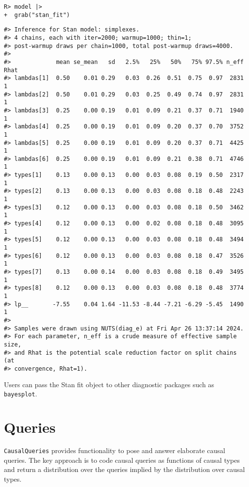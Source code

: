 \documentclass[
  11pt,
  article]{jss}
\begin{document}
\begin{verbatim}
R> model |> 
+  grab("stan_fit")
\end{verbatim}

\begin{verbatim}
#> Inference for Stan model: simplexes.
#> 4 chains, each with iter=2000; warmup=1000; thin=1; 
#> post-warmup draws per chain=1000, total post-warmup draws=4000.
#> 
#>             mean se_mean   sd   2.5%   25%   50%   75% 97.5% n_eff Rhat
#> lambdas[1]  0.50    0.01 0.29   0.03  0.26  0.51  0.75  0.97  2831    1
#> lambdas[2]  0.50    0.01 0.29   0.03  0.25  0.49  0.74  0.97  2831    1
#> lambdas[3]  0.25    0.00 0.19   0.01  0.09  0.21  0.37  0.71  1940    1
#> lambdas[4]  0.25    0.00 0.19   0.01  0.09  0.20  0.37  0.70  3752    1
#> lambdas[5]  0.25    0.00 0.19   0.01  0.09  0.20  0.37  0.71  4425    1
#> lambdas[6]  0.25    0.00 0.19   0.01  0.09  0.21  0.38  0.71  4746    1
#> types[1]    0.13    0.00 0.13   0.00  0.03  0.08  0.19  0.50  2317    1
#> types[2]    0.13    0.00 0.13   0.00  0.03  0.08  0.18  0.48  2243    1
#> types[3]    0.12    0.00 0.13   0.00  0.03  0.08  0.18  0.50  3462    1
#> types[4]    0.12    0.00 0.13   0.00  0.02  0.08  0.18  0.48  3095    1
#> types[5]    0.12    0.00 0.13   0.00  0.03  0.08  0.18  0.48  3494    1
#> types[6]    0.12    0.00 0.13   0.00  0.03  0.08  0.18  0.47  3526    1
#> types[7]    0.13    0.00 0.14   0.00  0.03  0.08  0.18  0.49  3495    1
#> types[8]    0.12    0.00 0.13   0.00  0.03  0.08  0.18  0.48  3774    1
#> lp__       -7.55    0.04 1.64 -11.53 -8.44 -7.21 -6.29 -5.45  1490    1
#> 
#> Samples were drawn using NUTS(diag_e) at Fri Apr 26 13:37:14 2024.
#> For each parameter, n_eff is a crude measure of effective sample size,
#> and Rhat is the potential scale reduction factor on split chains (at 
#> convergence, Rhat=1).
\end{verbatim}

Users can pass the Stan fit object to other diagnostic packages such as
\texttt{bayesplot}.

\section{Queries}\label{sec-query}

\texttt{CausalQueries} provides functionality to pose and answer
elaborate causal queries. The key approach is to code causal queries as
functions of causal types and return a distribution over the queries
implied by the distribution over causal types.
\end{document}
